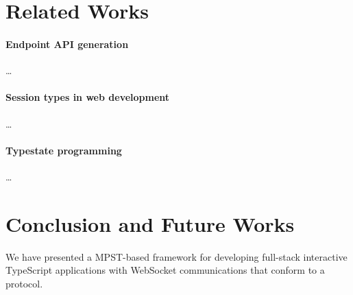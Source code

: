 \documentclass[submission,copyright,creativecommons]{eptcs}
\begin{document}
\section{Related Works}

\paragraph{Endpoint API generation} \dots


\paragraph{Session types in web development} \dots

\paragraph{Typestate programming} \dots

\section{Conclusion and Future Works}
We have presented a MPST-based framework for developing full-stack interactive TypeScript applications with WebSocket communications that conform to a protocol.
\end{document}
